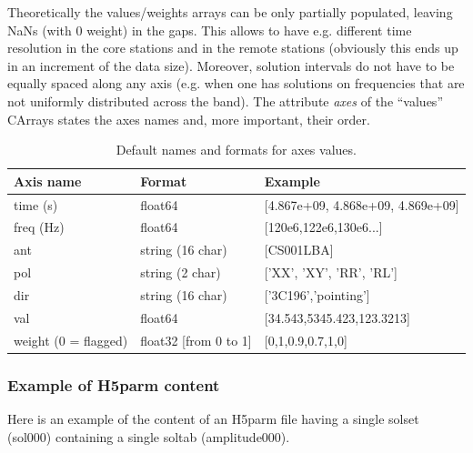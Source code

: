 \documentclass[]{article}
\begin{document}
Theoretically the values/weights arrays can be only partially populated, leaving NaNs (with 0 weight) in the gaps. This allows to have e.g. different time resolution in the core stations and in the remote stations (obviously this ends up in an increment of the data size). Moreover, solution intervals do not have to be equally spaced along any axis (e.g. when one has solutions on frequencies that are not uniformly distributed across the band). The attribute \textit{axes} of the ``values'' CArrays states the axes names and, more important, their order.

\begin{table}[!h]
\centering
\begin{tabular}{l l l}
\hline
\hline
Axis name & Format & Example\\
\hline
time (s) & float64 & [4.867e+09, 4.868e+09, 4.869e+09] \\
freq (Hz) & float64 & [120e6,122e6,130e6...]\\
ant & string (16 char) & [CS001LBA]\\
pol & string (2 char) & ['XX', 'XY', 'RR', 'RL']\\
dir & string (16 char)& ['3C196','pointing']\\
val & float64 & [34.543,5345.423,123.3213]\\
weight (0 = flagged) & float32 [from 0 to 1] & [0,1,0.9,0.7,1,0]\\
\hline
\end{tabular}
\caption{Default names and formats for axes values. \label{losoto:tab:axes}}
\end{table}

\subsubsection{Example of H5parm content}

Here is an example of the content of an H5parm file having a single solset (sol000) containing a single soltab (amplitude000).
\end{document}
